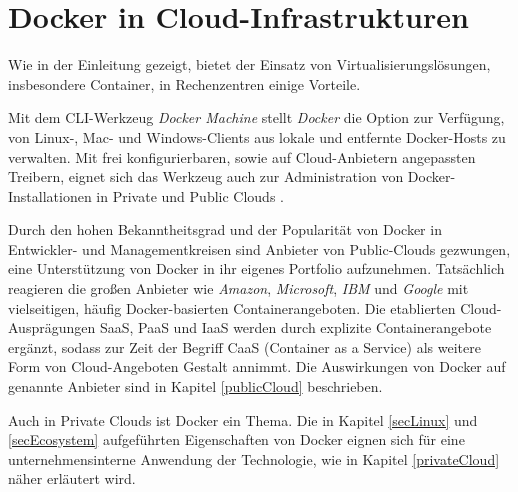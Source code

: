 \documentclass[../main.tex]{subfiles}
\begin{document}
\chapter{Docker in Cloud-Infrastrukturen}
\label{secInfrastructure}
  Wie in der Einleitung gezeigt, bietet der Einsatz von Virtualisierungslösungen, insbesondere Container, in Rechenzentren einige Vorteile.


  Mit dem CLI-Werkzeug \emph{Docker Machine} stellt \emph{Docker} die Option zur Verfügung, von Linux-, Mac- und Windows-Clients aus lokale und entfernte Docker-Hosts zu verwalten. Mit frei konfigurierbaren, sowie auf Cloud-Anbietern angepassten Treibern, eignet sich das Werkzeug auch zur Administration von Docker-Installationen in Private und Public Clouds \cite{dockerMachineOverview}\cite{dockerMachineDriverGeneric}\cite{dockerMachineOverviewCloud}.

  Durch den hohen Bekanntheitsgrad und der Popularität von Docker in Entwickler- und Managementkreisen sind Anbieter von Public-Clouds gezwungen, eine Unterstützung von Docker in ihr eigenes Portfolio aufzunehmen. Tatsächlich reagieren die großen Anbieter wie \emph{Amazon}, \emph{Microsoft}, \emph{IBM} und \emph{Google} mit vielseitigen, häufig Docker-basierten Containerangeboten. Die etablierten Cloud-Ausprägungen SaaS, PaaS und IaaS werden durch explizite Containerangebote ergänzt, sodass zur Zeit der Begriff CaaS (Container as a Service) als weitere Form von Cloud-Angeboten Gestalt annimmt. Die Auswirkungen von Docker auf genannte Anbieter sind in Kapitel \ref{publicCloud} beschrieben.

  Auch in Private Clouds ist Docker ein Thema. Die in Kapitel \ref{secLinux} und \ref{secEcosystem} aufgeführten Eigenschaften von Docker eignen sich für eine unternehmensinterne Anwendung der Technologie, wie in Kapitel \ref{privateCloud} näher erläutert wird.
\end{document}
